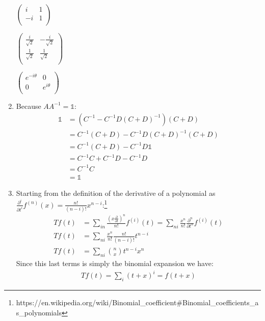 \documentclass[11pt]{article}
\newcommand{\p}[2]{\frac{\partial #1}{\partial #2}}
\begin{document}
\begin{enumerate}
    \begin{doublespace}
      \noindent\(\left(
      \begin{array}{cc}
        i  & 1 \\
        -i & 1 \\
      \end{array}
      \right)\)
    \end{doublespace}

    \begin{doublespace}
      \noindent\(\left(
      \begin{array}{cc}
        \frac{i}{\sqrt{2}} & -\frac{i}{\sqrt{2}} \\
        \frac{1}{\sqrt{2}} & \frac{1}{\sqrt{2}}  \\
      \end{array}
      \right)\)
    \end{doublespace}

    \begin{doublespace}
      \noindent\(\left(
      \begin{array}{cc}
        e^{-i \theta } & 0             \\
        0              & e^{i \theta } \\
      \end{array}
      \right)\)
    \end{doublespace}
    \item Because $AA^{-1}=\mathbb{1}$:
    \begin{align*}
      \mathbb{1}&=(C^{-1}-C^{-1}D(C+D)^{-1})(C+D)\\
      &=C^{-1}(C+D)-C^{-1}D(C+D)^{-1}(C+D)\\
      &=C^{-1}(C+D)-C^{-1}D\mathbb{1}\\
      &=C^{-1}C+C^{-1}D-C^{-1}D\\
      &=C^{-1}C\\
      &=\mathbb{1}
    \end{align*}
    \item Starting from the definition of the derivative of a polynomial as $\p{^i}{t^i}f^{(n)}(x)=\frac{n!}{(n-i)!}x^{n-i}$:\footnote{https://en.wikipedia.org/wiki/Binomial\_coefficient\#Binomial\_coefficients\_as\_polynomials}
    \begin{align*}
      Tf(t)&=\sum_{in} \frac{(x\p{}{t})^n}{n!}f^{(i)}(t)=\sum_{ni} \frac{x^n}{n!}\p{^n}{t^n}f^{(i)}(t)\\
      Tf(t)&=\sum_{ni} \frac{x^n}{n!}\frac{n!}{(n-i)!}t^{n-i}\\
      Tf(t)&=\sum_{ni} \binom{n}{x}t^{n-i}x^n
    \end{align*}
    Since this last terms is simply the binomial expansion we have:
    \begin{gather*}
      Tf(t)=\sum_{i} (t+x)^i=f(t+x)
    \end{gather*}
  \end{enumerate}
\end{document}
